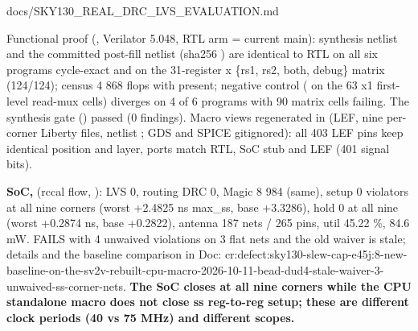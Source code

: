 \begin{relocated}{docs/SKY130_REAL_DRC_LVS_EVALUATION.md}
{}

Functional proof (,
Verilator 5.048, RTL arm = current main): synthesis netlist and the
committed post-fill netlist (sha256 ) are
identical to RTL on all six programs cycle-exact and on the 31-register
x \{rs1, rs2, both, debug\} matrix (124/\allowbreak{}124); census 4 868
flops with  present; negative control ( on the
63 x1 first-level read-mux cells) diverges on 4 of 6 programs with 90
matrix cells failing. The synthesis gate () passed (0
findings). Macro views regenerated in  (LEF,
nine per-corner Liberty files, netlist ; GDS and SPICE
gitignored): all 403 LEF pins keep identical position and layer, ports
match RTL, SoC stub and LEF (401 signal bits).

\textbf{SoC, } (rccal flow,
): LVS 0, routing DRC 0, Magic 8 984 (same),
setup 0 violators at all nine corners (worst +2.4825 ns max\_ss, base
+3.3286), hold 0 at all nine (worst +0.2874 ns, base +0.2822), antenna
187 nets / 265 pins, util 45.22 \%, 84.6 mW. 
FAILS with 4 unwaived violations on 3 flat nets and the old waiver is
stale; details and the baseline comparison in Doc:
cr:defect:sky130-slew-cap-e45j:8-new-baseline-on-the-sv2v-rebuilt-cpu-macro-2026-10-11-bead-dud4-stale-waiver-3-unwaived-ss-corner-nets.
\textbf{The SoC closes at all nine corners while the CPU standalone
macro does not close ss reg-to-reg setup; these are different clock
periods (40 vs 75 MHz) and different scopes.}
\end{relocated}

